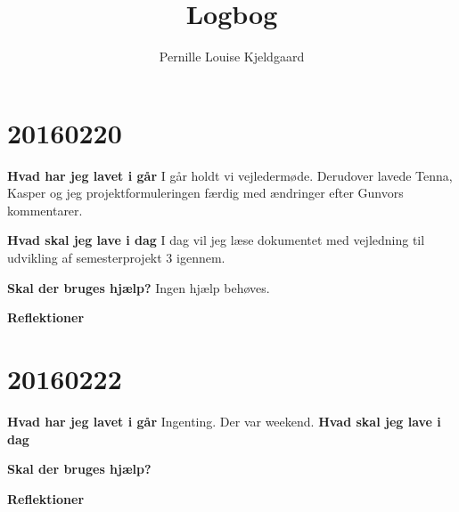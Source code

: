 \documentclass{article}
\title{Logbog}
\author{Pernille Louise Kjeldgaard}
\date{}
\begin{document}
	\maketitle
	\tableofcontents
	
	\section{20160220}
	
	\textbf{Hvad har jeg lavet i går}
	I går holdt vi vejledermøde. Derudover lavede Tenna, Kasper og jeg projektformuleringen færdig med ændringer efter Gunvors kommentarer. 
	
	\textbf{Hvad skal jeg lave i dag}
	I dag vil jeg læse dokumentet med vejledning til udvikling af semesterprojekt 3 igennem. 
	
	\textbf{Skal der bruges hjælp?}
	Ingen hjælp behøves. 
	
	\textbf{Reflektioner}
			
	\section{20160222}
		
	\textbf{Hvad har jeg lavet i går}
		Ingenting. Der var weekend. 
	\textbf{Hvad skal jeg lave i dag}
		
	\textbf{Skal der bruges hjælp?}
		
	\textbf{Reflektioner}
	
	
	
\end{document}
